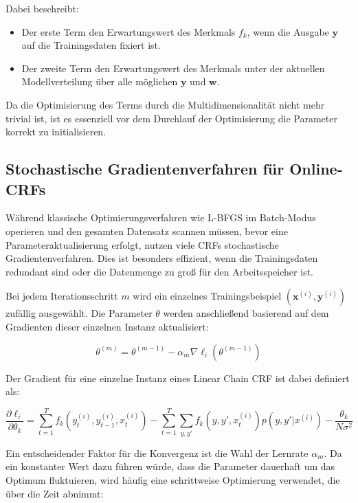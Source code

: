 Dabei beschreibt:
\begin{itemize}
    \item Der erste Term den Erwartungswert des Merkmals $f_k$, wenn die Ausgabe $\mathbf{y}$ auf die Trainingsdaten fixiert ist.
    \item Der zweite Term den Erwartungswert des Merkmals unter der aktuellen Modellverteilung über alle möglichen $\mathbf{y}$ und $\mathbf{w}$.
\end{itemize}

Da die Optimisierung des Terms durch die Multidimensionalität nicht mehr trivial ist, ist es essenziell vor dem Durchlauf der Optimisierung die Parameter korrekt zu initialisieren. \cite{SuttonMcCallum2012}

\subsection{Stochastische Gradientenverfahren für Online-CRFs}

Während klassische Optimierungsverfahren wie L-BFGS \cite{liu1989limited} im Batch-Modus operieren und den gesamten Datensatz scannen müssen, bevor eine Parameteraktualisierung erfolgt, nutzen viele CRFs stochastische Gradientenverfahren. Dies ist besonders effizient, wenn die Trainingsdaten redundant sind oder die Datenmenge zu groß für den Arbeitsspeicher ist.

Bei jedem Iterationsschritt $m$ wird ein einzelnes Trainingsbeispiel $(\mathbf{x}^{(i)}, \mathbf{y}^{(i)})$ zufällig ausgewählt. Die Parameter $\theta$ werden anschließend basierend auf dem Gradienten dieser einzelnen Instanz aktualisiert:

\begin{equation}
\theta^{(m)} = \theta^{(m-1)} - \alpha_m \nabla \ell_i(\theta^{(m-1)})
\end{equation}

Der Gradient für eine einzelne Instanz eines Linear Chain CRF ist dabei definiert als:

\begin{equation}
\frac{\partial\ell_i}{\partial\theta_k} = \sum_{t=1}^{T} f_k(y_t^{(i)}, y_{t-1}^{(i)}, x_t^{(i)}) - \sum_{t=1}^{T} \sum_{y, y'} f_k(y, y', x_t^{(i)}) p(y, y' | x^{(i)}) - \frac{\theta_k}{N\sigma^2}
\end{equation}

Ein entscheidender Faktor für die Konvergenz ist die Wahl der Lernrate $\alpha_m$. Da ein konstanter Wert dazu führen würde, dass die Parameter dauerhaft um das Optimum fluktuieren, wird häufig eine schrittweise Optimierung verwendet, die über die Zeit abnimmt:

